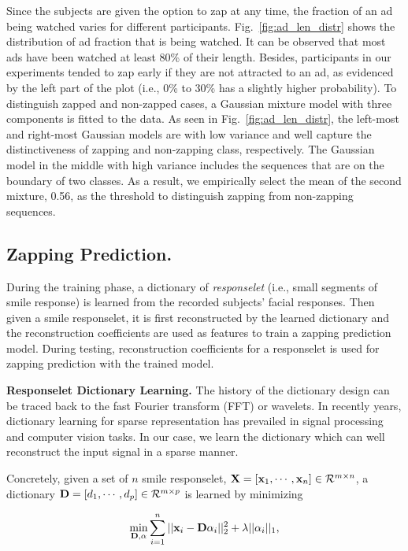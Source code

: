 \documentclass[twoside,leqno,twocolumn]{article}
\begin{document}
Since the subjects are given the option to zap at any time, the fraction of an ad being watched varies for different participants. Fig.~\ref{fig:ad_len_distr} shows the distribution of ad fraction that is being watched. It can be observed that most ads have been watched at least 80\% of their length. Besides, participants in our experiments tended to zap early if they are not attracted to an ad, as evidenced by the left part of the plot (i.e., 0\% to 30\% has a slightly higher probability). To distinguish zapped and non-zapped cases, a Gaussian mixture model with three components is fitted to the data. As seen in Fig.~\ref{fig:ad_len_distr}, the left-most and right-most Gaussian models are with low variance and well capture the distinctiveness of zapping and non-zapping class, respectively. The Gaussian model in the middle with high variance includes the sequences that are on the boundary of two classes. As a result, we empirically select the mean of the second mixture, 0.56, as the threshold to distinguish zapping from non-zapping sequences.



\subsection{Zapping Prediction.}

During the training phase, a dictionary of \textit{responselet} (i.e., small segments of smile response) is learned from the recorded subjects' facial responses. Then given a smile responselet, it is first reconstructed by the learned dictionary and the reconstruction coefficients are used as features to train a zapping prediction model. During testing, reconstruction coefficients for a responselet is used for zapping prediction with the trained model. 

\noindent \textbf{Responselet Dictionary Learning.} The history of the dictionary design can be traced back to the fast Fourier transform (FFT) or wavelets. In recently years, dictionary learning for sparse representation has prevailed in signal processing and computer vision tasks. In our case, we learn the dictionary which can well reconstruct the input signal in a sparse manner. 

Concretely, given a set of $n$ smile responselet, ${\bf X}=[{\bf x}_1, \cdots, {\bf x}_n]\in \mathcal{R}^{m\times n}$, a dictionary ${\bf D}=[d_1,\cdots,d_p] \in \mathcal{R}^{m\times p}$ is learned by minimizing

\begin{align}
\label{eq:learn_dict}
\min_{{\bf D} , \alpha} \sum_{i=1}^n ||{\bf x}_i-{\bf D}\alpha_i||^2_2 +\lambda ||\alpha_i||_1,
\end{align}
\end{document}
